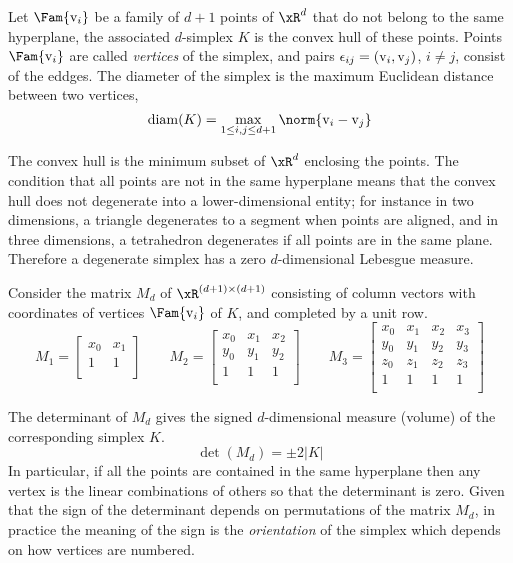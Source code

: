 \begin{dfntn}[Simplex]
Let $\Fam{\vertex_i}$ be a family of $d + 1$ points of $\xR^d$ that do not belong to the same hyperplane, the associated $d$-simplex $K$ is the convex hull of these points.
Points $\Fam{\vertex_i}$ are called \textit{vertices} of the simplex, and pairs $\epsilon_{ij} = ({\mathrm v}_i, {\mathrm v}_j)$, $i\neq j$, consist of the eddges.
The diameter of the simplex is the maximum Euclidean distance between two vertices,
\[
\diam(K) = \displaystyle\max_{1\leq i,j\leq d+1}\norm{\vertex_i - \vertex_j}
\]
\end{dfntn}

The convex hull is the minimum subset of $\xR^d$ enclosing the points.
The condition that all points are not in the same hyperplane means that the convex hull does not degenerate into a lower-dimensional entity; for instance in two dimensions, a triangle degenerates to a segment when points are aligned, and in three dimensions, a tetrahedron degenerates if all points are in the same plane.
Therefore a degenerate simplex has a zero $d$-dimensional Lebesgue measure.

\medskip
Consider the matrix $M_d$ of $\xR^{(d+1)\times(d+1)}$ consisting of column vectors with coordinates of vertices $\Fam{\vertex_i}$ of $K$, and completed by a unit row.
\begin{equation*}
M_1 =
\begin{bmatrix}
x_0 & x_1 \\
1   & 1   \\
\end{bmatrix}
\qquad
M_2 =
\begin{bmatrix}
x_0 & x_1 & x_2 \\
y_0 & y_1 & y_2 \\
1   & 1   & 1   \\
\end{bmatrix}
\qquad
M_3 =
\begin{bmatrix}
x_0 & x_1 & x_2 & x_3 \\
y_0 & y_1 & y_2 & y_3 \\
z_0 & z_1 & z_2 & z_3 \\
1   & 1   & 1   & 1   \\
\end{bmatrix}
\end{equation*}

The determinant of $M_d$ gives the signed $d$-dimensional measure (volume) of the corresponding simplex $K$.
\begin{equation*}
\det(M_d) = \pm 2 |K|
\end{equation*}
In particular, if all the points are contained in the same hyperplane then any vertex is the linear combinations of others so that the determinant is zero.
Given that the sign of the determinant depends on permutations of the matrix $M_d$, in practice the meaning of the sign is the \textit{orientation} of the simplex which depends on how vertices are numbered.


